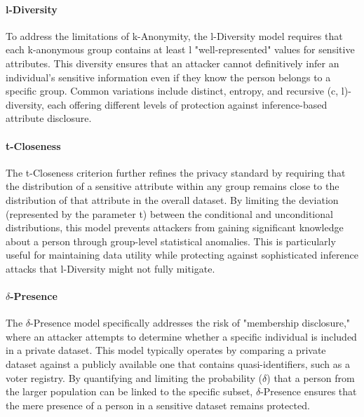 \paragraph{l-Diversity}
To address the limitations of k-Anonymity, the l-Diversity model requires that each k-anonymous group contains at least l "well-represented" values for sensitive attributes. This diversity ensures that an attacker cannot definitively infer an individual's sensitive information even if they know the person belongs to a specific group. Common variations include distinct, entropy, and recursive (c, l)-diversity, each offering different levels of protection against inference-based attribute disclosure.
\autocite[92--93]{Krebs2022}
\autocite[61--62]{gmdsbvd2024praxishilfe}
\autocite[34]{schwartmann2022praxisleitfaden}

\paragraph{t-Closeness}
The t-Closeness criterion further refines the privacy standard by requiring that the distribution of a sensitive attribute within any group remains close to the distribution of that attribute in the overall dataset. By limiting the deviation (represented by the parameter t) between the conditional and unconditional distributions, this model prevents attackers from gaining significant knowledge about a person through group-level statistical anomalies. This is particularly useful for maintaining data utility while protecting against sophisticated inference attacks that l-Diversity might not fully mitigate.
\autocite[93--94]{Krebs2022}
\autocite[62]{gmdsbvd2024praxishilfe}

\paragraph{$\delta$-Presence}
The $\delta$-Presence model specifically addresses the risk of "membership disclosure," where an attacker attempts to determine whether a specific individual is included in a private dataset. This model typically operates by comparing a private dataset against a publicly available one that contains quasi-identifiers, such as a voter registry. By quantifying and limiting the probability ($\delta$) that a person from the larger population can be linked to the specific subset, $\delta$-Presence ensures that the mere presence of a person in a sensitive dataset remains protected.
\autocite[94]{Krebs2022}
\autocite[62--63]{gmdsbvd2024praxishilfe}

